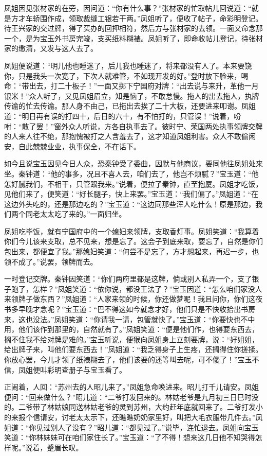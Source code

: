 \documentclass[12pt,oneside]{book}
\begin{document}
凤姐因见张材家的在旁，因问道：“你有什么事？”张材家的忙取帖儿回说道：“就是方才车轿围作成，领取裁缝工银若干两。”凤姐听了，便收了帖子，命彩明登记。待王兴家的交过牌，得了买办的回押相符，然后方与张材家的去领。一面又命念那一个，是为宝玉外书房完竣，支买纸料糊裱。凤姐听了，即命收帖儿登记，待张材家的缴清，又发与这人去了。

凤姐便说道：“明儿他也睡迷了，后儿我也睡迷了，将来都没有人了。本来要饶你，只是我头一次宽了，下次人就难管，不如现开发的好。”登时放下脸来，喝命：“带出去，打二十板子！”一面又掷下宁国府对牌：“出去说与来升，革他一月银米！”众人听了，又见凤姐眉立，知是恼了，不敢怠慢。拖人的出去拖人，执牌传谕的忙去传谕。那人身不由己，已拖出去挨了二十大板，还要进来叩谢。凤姐道：“明日再有误的打四十，后日的六十，有不怕打的，只管误！”说着，吩咐：“散了罢！”窗外众人听说，方各自执事去了。彼时宁、荣国两处执事领牌交牌的人来人往不绝，那抱愧被打之人含羞去了，这才知道凤姐利害。众人不敢偷闲安，自此兢兢业业，执事保全，不在话下。

如今且说宝玉因见今日人众，恐秦钟受了委曲，因默与他商议，要同他往凤姐处来坐。秦钟道：“他的事多，况且不喜人去，咱们去了，他岂不烦腻？”宝玉道：“他怎好腻我们，不相干，只管跟我来。”说着，便拉了秦钟，直至抱厦。凤姐才吃饭，见他们来了，便笑道：“好长腿子，快上来罢。”宝玉道：“我们偏了。”凤姐道：“在这边外头吃的，还是那边吃的？”宝玉道：“这边同那些浑人吃什么！原是那边，我们两个同老太太吃了来的。”一面归坐。

凤姐吃毕饭，就有宁国府中的一个媳妇来领牌，支取香灯事。凤姐笑道：“我算着你们今儿该来支取，总不见来，想是忘了。这会子到底来取，要忘了，自然是你们包出来，都便宜了我。”那媳妇笑道：“何尝不是忘了，方才想起来，再迟一步，也领不成了。”说罢，领牌而去。

一时登记交牌。秦钟因笑道：“你们两府里都是这牌，倘或别人私弄一个，支了银子跑了，怎样？”凤姐笑道：“依你说，都没王法了？”宝玉因道：“怎么咱们家没人来领牌子做东西？”凤姐道：“人家来领的时候，你还做梦呢！我且问你，你们这夜书多早晚才念呢？”宝玉道：“巴不得这如今就念才好，他们只是不快收拾出书房来，这也没法。”凤姐笑道：“你请我一请，包管就快了。”宝玉道：“你要快也不中用，他们该作到那里的，自然就有了。”凤姐笑道：“便是他们作，也得要东西去，搁不住我不给对牌是难的。”宝玉听说，便猴向凤姐身上立刻要牌，说：“好姐姐，给出牌子来，叫他们要东西去！”凤姐道：“我乏得身子上生疼，还搁得住你搓揉。你放心罢，今儿才领了纸裱糊去了，他们该要的还等叫去呢，可不傻了！”宝玉不信，凤姐便叫彩明查册子与宝玉看了。

正闹着，人回：“苏州去的人昭儿来了。”凤姐急命唤进来。昭儿打千儿请安。凤姐便问：“回来做什么？”昭儿道：“二爷打发回来的。林姑老爷是九月初三日巳时没的。二爷带了林姑娘同送林姑老爷的灵到苏州，大约赶年底就回来了。二爷打发小的来报个信请安，讨老太太示下，还瞧瞧奶奶家里好，叫把大毛衣服带几件去。”凤姐道：“你见过别人了没有？”昭儿道：“都见过了。”说毕，连忙退去。凤姐向宝玉笑道：“你林妹妹可在咱们家住长了。”宝玉道：“了不得！想来这几日他不知哭得怎样呢。”说着，蹙眉长叹。
\end{document}
